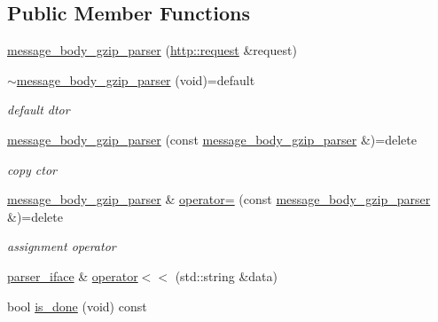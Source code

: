 \subsection*{Public Member Functions}
\begin{DoxyCompactItemize}
\item 
\hyperlink{classnetflex_1_1parsing_1_1message__body__gzip__parser_a8f5b49b2af4bd6c96dad3959f04c763b}{message\+\_\+body\+\_\+gzip\+\_\+parser} (\hyperlink{classnetflex_1_1http_1_1request}{http\+::request} \&request)
\item 
\mbox{\label{classnetflex_1_1parsing_1_1message__body__gzip__parser_a419851e77f95541063cfdaa9f0d65ecd}} 
\hyperlink{classnetflex_1_1parsing_1_1message__body__gzip__parser_a419851e77f95541063cfdaa9f0d65ecd}{$\sim$message\+\_\+body\+\_\+gzip\+\_\+parser} (void)=default
\begin{DoxyCompactList}\small\item\em default dtor \end{DoxyCompactList}\item 
\mbox{\label{classnetflex_1_1parsing_1_1message__body__gzip__parser_a5c516454893dbda1a8ff93d7815b12a9}} 
\hyperlink{classnetflex_1_1parsing_1_1message__body__gzip__parser_a5c516454893dbda1a8ff93d7815b12a9}{message\+\_\+body\+\_\+gzip\+\_\+parser} (const \hyperlink{classnetflex_1_1parsing_1_1message__body__gzip__parser}{message\+\_\+body\+\_\+gzip\+\_\+parser} \&)=delete
\begin{DoxyCompactList}\small\item\em copy ctor \end{DoxyCompactList}\item 
\mbox{\label{classnetflex_1_1parsing_1_1message__body__gzip__parser_ab28726f6d793f340cb630cfcaa6e3126}} 
\hyperlink{classnetflex_1_1parsing_1_1message__body__gzip__parser}{message\+\_\+body\+\_\+gzip\+\_\+parser} \& \hyperlink{classnetflex_1_1parsing_1_1message__body__gzip__parser_ab28726f6d793f340cb630cfcaa6e3126}{operator=} (const \hyperlink{classnetflex_1_1parsing_1_1message__body__gzip__parser}{message\+\_\+body\+\_\+gzip\+\_\+parser} \&)=delete
\begin{DoxyCompactList}\small\item\em assignment operator \end{DoxyCompactList}\item 
\hyperlink{classnetflex_1_1parsing_1_1parser__iface}{parser\+\_\+iface} \& \hyperlink{classnetflex_1_1parsing_1_1message__body__gzip__parser_a5206f23709657035b665238966a5cf13}{operator$<$$<$} (std\+::string \&data)
\item 
bool \hyperlink{classnetflex_1_1parsing_1_1message__body__gzip__parser_a7751bc115acc99af5ab7d8f1a6de5581}{is\+\_\+done} (void) const
\end{DoxyCompactItemize}
